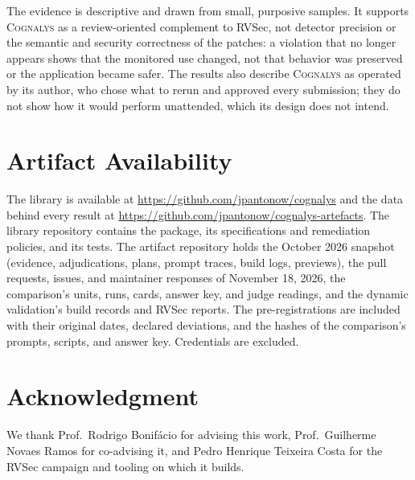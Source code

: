 \documentclass[conference]{IEEEtran}
\newcommand{\system}{\textsc{Cognalys}}
\begin{document}
The evidence is descriptive and drawn from small, purposive samples. It
supports \system{} as a review-oriented complement to RVSec, not detector
precision or the semantic and security correctness of the patches: a violation
that no longer appears shows that the monitored use changed, not that behavior
was preserved or the application became safer. The results also describe
\system{} as operated by its author, who chose what to rerun and approved every
submission; they do not show how it would perform unattended, which its design
does not intend.

\section*{Artifact Availability}

The library is available at \url{https://github.com/jpantonow/cognalys} and the
data behind every result at \url{https://github.com/jpantonow/cognalys-artefacts}. The library
repository contains the package, its specifications and remediation policies,
and its tests. The artifact repository holds the October 2026 snapshot
(evidence, adjudications, plans, prompt traces, build logs, previews), the pull
requests, issues, and maintainer responses of November 18, 2026, the
comparison's units, runs, cards, answer key, and judge readings, and the
dynamic validation's build records and RVSec reports. The pre-registrations are
included with their original dates, declared deviations, and the hashes of the
comparison's prompts, scripts, and answer key. Credentials are excluded.

\section*{Acknowledgment}

We thank Prof.\ Rodrigo Bonifácio for advising this work, Prof.\ Guilherme
Novaes Ramos for co-advising it, and Pedro Henrique Teixeira Costa for the
RVSec campaign and tooling on which it builds.



\end{document}
